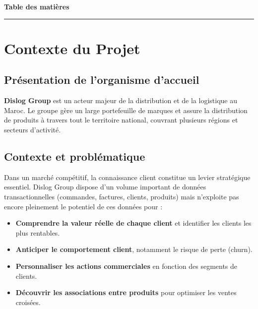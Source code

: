 \documentclass[11pt,a4paper]{article}
\begin{document}
\newpage
\thispagestyle{empty}
\vspace*{1cm}
\begin{center}
  {\color{primary}\LARGE\bfseries Table des matières}\\[2pt]
  {\color{accent}\rule{4cm}{1.5pt}}
\end{center}
\vspace{0.5cm}
\tableofcontents
\newpage

\section{Contexte du Projet}

\subsection{Présentation de l'organisme d'accueil}

\textbf{Dislog Group} est un acteur majeur de la distribution et de la logistique au Maroc. Le groupe gère un large portefeuille de marques et assure la distribution de produits à travers tout le territoire national, couvrant plusieurs régions et secteurs d'activité.

\subsection{Contexte et problématique}

Dans un marché compétitif, la connaissance client constitue un levier stratégique essentiel. Dislog Group dispose d'un volume important de données transactionnelles (commandes, factures, clients, produits) mais n'exploite pas encore pleinement le potentiel de ces données pour :

\begin{itemize}[noitemsep, leftmargin=1.5em]
  \item \textbf{Comprendre la valeur réelle de chaque client} et identifier les clients les plus rentables.
  \item \textbf{Anticiper le comportement client}, notamment le risque de perte (churn).
  \item \textbf{Personnaliser les actions commerciales} en fonction des segments de clients.
  \item \textbf{Découvrir les associations entre produits} pour optimiser les ventes croisées.
\end{itemize}
\end{document}
